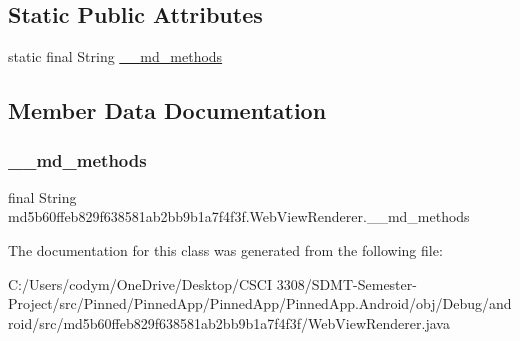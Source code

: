 \subsection*{Static Public Attributes}
\begin{DoxyCompactItemize}
\item 
static final String \hyperlink{classmd5b60ffeb829f638581ab2bb9b1a7f4f3f_1_1_web_view_renderer_a023fa86f93ecfb325971c3a7204ebc7e}{\+\_\+\+\_\+md\+\_\+methods}
\end{DoxyCompactItemize}


\subsection{Member Data Documentation}
\mbox{\label{classmd5b60ffeb829f638581ab2bb9b1a7f4f3f_1_1_web_view_renderer_a023fa86f93ecfb325971c3a7204ebc7e}} 
\subsubsection{\texorpdfstring{\+\_\+\+\_\+md\+\_\+methods}{\_\_md\_methods}}
{\footnotesize\ttfamily final String md5b60ffeb829f638581ab2bb9b1a7f4f3f.\+Web\+View\+Renderer.\+\_\+\+\_\+md\+\_\+methods\hspace{0.3cm}{\ttfamily [static]}}



The documentation for this class was generated from the following file\+:\begin{DoxyCompactItemize}
\item 
C\+:/\+Users/codym/\+One\+Drive/\+Desktop/\+C\+S\+C\+I 3308/\+S\+D\+M\+T-\/\+Semester-\/\+Project/src/\+Pinned/\+Pinned\+App/\+Pinned\+App/\+Pinned\+App.\+Android/obj/\+Debug/android/src/md5b60ffeb829f638581ab2bb9b1a7f4f3f/Web\+View\+Renderer.\+java\end{DoxyCompactItemize}
